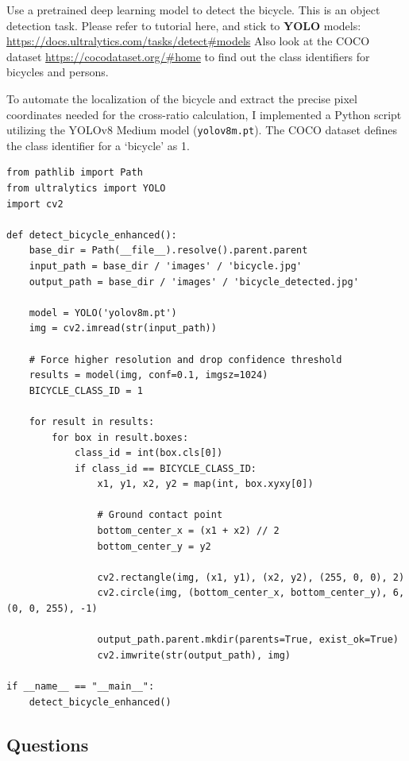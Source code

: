 Use a pretrained deep learning model to detect the
bicycle.
This is an object detection task. Please refer to tutorial here, and stick to \textbf{YOLO} models: \url{https://docs.ultralytics.com/tasks/detect#models}
Also look at the COCO dataset \url{https://cocodataset.org/#home} to find out the class identifiers for bicycles and persons.
\begin{studentSpace}
To automate the localization of the bicycle and extract the precise pixel coordinates needed for the cross-ratio calculation, I implemented a Python script utilizing the YOLOv8 Medium model (\texttt{yolov8m.pt}). The COCO dataset defines the class identifier for a `bicycle' as 1.

\begin{verbatim}
from pathlib import Path
from ultralytics import YOLO
import cv2

def detect_bicycle_enhanced():
    base_dir = Path(__file__).resolve().parent.parent
    input_path = base_dir / 'images' / 'bicycle.jpg'
    output_path = base_dir / 'images' / 'bicycle_detected.jpg'

    model = YOLO('yolov8m.pt')
    img = cv2.imread(str(input_path))

    # Force higher resolution and drop confidence threshold
    results = model(img, conf=0.1, imgsz=1024)
    BICYCLE_CLASS_ID = 1

    for result in results:
        for box in result.boxes:
            class_id = int(box.cls[0])
            if class_id == BICYCLE_CLASS_ID:
                x1, y1, x2, y2 = map(int, box.xyxy[0])
                
                # Ground contact point
                bottom_center_x = (x1 + x2) // 2
                bottom_center_y = y2

                cv2.rectangle(img, (x1, y1), (x2, y2), (255, 0, 0), 2)
                cv2.circle(img, (bottom_center_x, bottom_center_y), 6, (0, 0, 255), -1)
                
                output_path.parent.mkdir(parents=True, exist_ok=True)
                cv2.imwrite(str(output_path), img)

if __name__ == "__main__":
    detect_bicycle_enhanced()
\end{verbatim}
\end{studentSpace}


\subsection{Questions}

